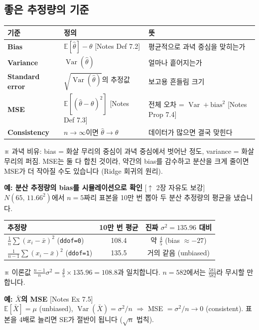 \documentclass[11pt,a4paper]{article}
\newcommand{\E}{\mathbb{E}}
\newcommand{\Var}{\operatorname{Var}}
\newcommand{\term}[1]{\textbf{#1}}
\newcommand{\code}[1]{\texttt{#1}}
\newcommand{\nref}[1]{{\footnotesize\textsf{\color{blue!55!black}[Notes #1]}}}
\newcommand{\aside}[1]{{\footnotesize\color{black!65}#1}}
\newcommand{\linkup}[1]{{\footnotesize\textsf{\color{green!40!black}[$\uparrow$ #1 보강]}}}
\begin{document}
\subsection{좋은 추정량의 기준}
\begin{center}
\begin{tabular}{@{}p{2.8cm} p{5.2cm} p{6.2cm}@{}}
\toprule
기준 & 정의 & 뜻 \\
\midrule
\term{Bias} & $\E[\hat\theta]-\theta$ \nref{Def 7.2} & 평균적으로 과녁 중심을 맞히는가 \\
\term{Variance} & $\Var(\hat\theta)$ & 얼마나 흩어지는가 \\
\term{Standard error} & $\sqrt{\Var(\hat\theta)}$의 추정값 & 보고용 흔들림 크기 \\
\term{MSE} & $\E[(\hat\theta-\theta)^2]$ \nref{Def 7.3} & 전체 오차 = $\Var+\text{bias}^2$ \nref{Prop 7.4} \\
\term{Consistency} & $n\to\infty$이면 $\hat\theta\to\theta$ & 데이터가 많으면 결국 맞힌다 \\
\bottomrule
\end{tabular}
\end{center}
\aside{※ 과녁 비유: bias = 화살 무리의 중심이 과녁 중심에서 벗어난 정도, variance = 화살 무리의 퍼짐. MSE는 둘 다 합친 것이라, 약간의 bias를 감수하고 분산을 크게 줄이면 MSE가 더 작아질 수도 있습니다 (Ridge 회귀의 원리).}

\textbf{예: 분산 추정량의 bias를 시뮬레이션으로 확인} \linkup{2장 자유도}\\
$N(65,\,11.66^2)$에서 $n=5$짜리 표본을 10만 번 뽑아 두 분산 추정량의 평균을 냈습니다.
\begin{center}
\begin{tabular}{@{}l c c@{}}
\toprule
추정량 & 10만 번 평균 & 진짜 $\sigma^2=135.96$ 대비 \\
\midrule
$\frac1n\sum(x_i-\bar x)^2$ (\code{ddof=0}) & 108.4 & 약 $\frac45$ (bias $\approx-27$) \\
$\frac1{n-1}\sum(x_i-\bar x)^2$ (\code{ddof=1}) & 135.5 & 거의 같음 (unbiased) \\
\bottomrule
\end{tabular}
\end{center}
\aside{※ 이론값 $\frac{n-1}n\sigma^2=\frac45\times135.96=108.8$과 일치합니다. $n=582$에서는 $\frac{581}{582}$라 무시할 만합니다.}

\textbf{예: $\bar X$의 MSE} \nref{Ex 7.5}\\
$\E[\bar X]=\mu$ (unbiased), $\Var(\bar X)=\sigma^2/n$ $\Rightarrow$ MSE $=\sigma^2/n\to0$ (consistent). 표본을 4배로 늘리면 SE가 절반이 됩니다 ($\sqrt n$ 법칙).
\end{document}
